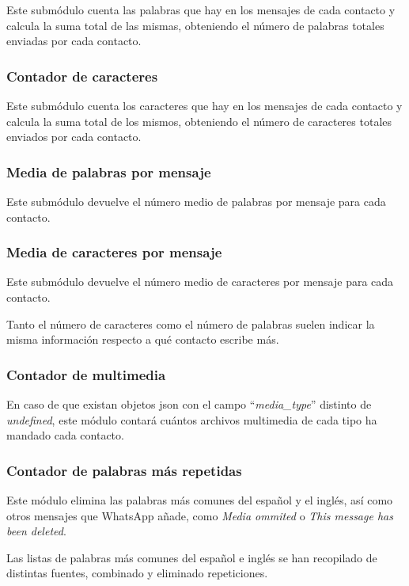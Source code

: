 Este submódulo cuenta las palabras que hay en los mensajes de cada contacto y calcula la suma total de las mismas, obteniendo el número de palabras totales enviadas por cada contacto.

\subsubsection{Contador de caracteres}

Este submódulo cuenta los caracteres que hay en los mensajes de cada contacto y calcula la suma total de los mismos, obteniendo el número de caracteres totales enviados por cada contacto.

\subsubsection{Media de palabras por mensaje}

Este submódulo devuelve el número medio de palabras por mensaje para cada contacto.

\subsubsection{Media de caracteres por mensaje}

Este submódulo devuelve el número medio de caracteres por mensaje para cada contacto.

Tanto el número de caracteres como el número de palabras suelen indicar la misma información respecto a qué contacto escribe más.

\subsubsection{Contador de multimedia}

En caso de que existan objetos \acrshort{json} con el campo ``\textit{media\_type}'' distinto de \textit{undefined}, este módulo contará cuántos archivos multimedia de cada tipo ha mandado cada contacto.

\subsubsection{Contador de palabras más repetidas}

Este módulo elimina las palabras más comunes del español y el inglés, así como otros mensajes que WhatsApp añade, como \textit{Media ommited} o \textit{This message has been deleted}.

Las listas de palabras más comunes del español e inglés se han recopilado de distintas fuentes, combinado y eliminado repeticiones.

